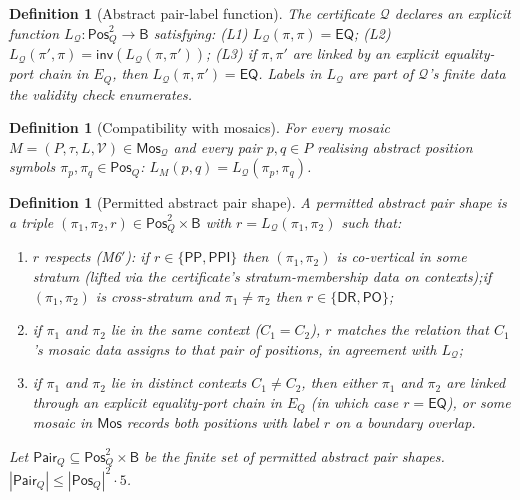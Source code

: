 \documentclass[11pt]{article}
\newtheorem{definition}[theorem]{Definition}
\newcommand{\Base}{\mathsf{B}}
\newcommand{\EQ}{\mathsf{EQ}}
\newcommand{\DR}{\mathsf{DR}}
\newcommand{\PO}{\mathsf{PO}}
\newcommand{\PP}{\mathsf{PP}}
\newcommand{\PPI}{\mathsf{PPI}}
\newcommand{\Inv}{\mathsf{inv}}
\newcommand{\Q}{\mathcal Q}
\newcommand{\Mos}{\mathsf{Mos}}
\newcommand{\Pos}{\mathsf{Pos}}
\newcommand{\Pair}{\mathsf{Pair}}
\begin{document}
\begin{definition}[Abstract pair-label function]\label{def:Lq}
The certificate $\Q$ declares an explicit function
$L_\Q:\Pos_Q^2\to\Base$ satisfying: (L1) $L_\Q(\pi,\pi)=\EQ$; (L2)
$L_\Q(\pi',\pi)=\Inv(L_\Q(\pi,\pi'))$; (L3) if $\pi,\pi'$ are linked
by an explicit equality-port chain in $E_Q$, then
$L_\Q(\pi,\pi')=\EQ$.  Labels in $L_\Q$ are part of $\Q$'s finite
data the validity check enumerates.
\end{definition}

\begin{definition}[Compatibility with mosaics]\label{def:LM-Lq}
For every mosaic $M=(P,\tau,L,\mathcal V)\in\Mos_\Q$ and every pair
$p,q\in P$ realising abstract position symbols $\pi_p,\pi_q\in
\Pos_Q$:  $L_M(p,q)=L_\Q(\pi_p,\pi_q)$.
\end{definition}

\begin{definition}[Permitted abstract pair shape]\label{def:abs-pair}
A permitted abstract pair shape is a triple
$(\pi_1,\pi_2,r)\in\Pos_Q^2\times\Base$ with $r=L_\Q(\pi_1,\pi_2)$
such that:
\begin{enumerate}[label=(P\arabic*)]
\item $r$ respects (M6$'$): if $r\in\{\PP,\PPI\}$ then
$(\pi_1,\pi_2)$ is co-vertical in some stratum (lifted via the
certificate's stratum-membership data on contexts);\@ if
$(\pi_1,\pi_2)$ is cross-stratum and $\pi_1\neq\pi_2$ then
$r\in\{\DR,\PO\}$;
\item if $\pi_1$ and $\pi_2$ lie in the same context ($C_1=C_2$),
$r$ matches the relation that $C_1$'s mosaic data assigns to that
pair of positions, in agreement with $L_\Q$;
\item if $\pi_1$ and $\pi_2$ lie in distinct contexts
$C_1\neq C_2$, then either $\pi_1$ and $\pi_2$ are linked through
an explicit equality-port chain in $E_Q$ (in which case $r=\EQ$),
or some mosaic in $\Mos$ records both positions
with label $r$ on a boundary overlap.
\end{enumerate}
Let $\Pair_Q\subseteq\Pos_Q^2\times\Base$ be the finite set of
permitted abstract pair shapes.  $|\Pair_Q|\le|\Pos_Q|^2\cdot 5$.
\end{definition}
\end{document}
